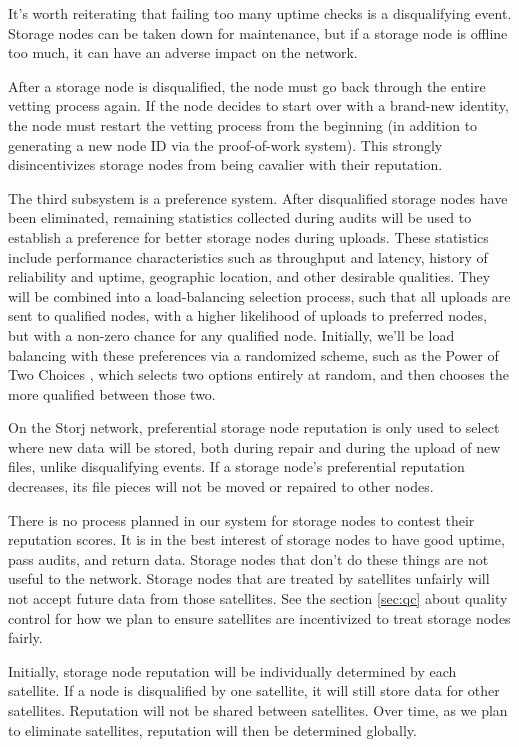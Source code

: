 \documentclass[11pt,fleqn,openany]{book}
\begin{document}
It's worth reiterating that failing too many uptime checks is a disqualifying
event. Storage nodes can be taken down for maintenance, but if a storage node
is offline too much, it can have an adverse impact on the network.

After a storage node is disqualified, the node must go back through the entire
vetting process again. If the node decides to start over with a brand-new
identity, the node must restart the vetting process from the beginning (in
addition to generating a new node ID via the proof-of-work system). This
strongly disincentivizes storage nodes from being cavalier with their
reputation.

The third subsystem is a preference system. After disqualified storage nodes
have been eliminated, remaining statistics collected during audits
will be used to establish a preference for better storage nodes during uploads.
These statistics include performance characteristics such as throughput and
latency, history of reliability and uptime, geographic location, and other
desirable qualities.
They will be combined into a load-balancing selection process, such
that all uploads are sent to qualified nodes, with a higher likelihood of
uploads to preferred nodes, but with a non-zero chance for any qualified node.
Initially, we'll be load balancing with these preferences via a randomized
scheme, such as the Power of Two Choices \cite{power-of-two-choices}, which
selects two options entirely at random, and then chooses the more qualified
between those two.

On the Storj network, preferential storage node reputation is only used to
select where new data will be stored, both during repair and during the
upload of new files, unlike disqualifying events.
If a storage node's preferential reputation decreases, its file pieces will not
be moved or repaired to other nodes.

There is no process planned in our system for storage nodes to contest their
reputation scores. It is in the best interest of storage nodes to have good
uptime, pass audits, and return data. Storage nodes that don't do these things
are not useful to the network. Storage nodes that are treated by satellites
unfairly will not accept future data from those satellites. See the section
\ref{sec:qc} about quality control for how we plan to ensure satellites are
incentivized to treat storage nodes fairly.

Initially, storage node reputation will be individually determined by each
satellite. If a node is disqualified by one satellite, it will still
store data for other satellites. Reputation will not be shared between
satellites. Over time, as we plan to eliminate satellites,
reputation will then be determined globally.
\end{document}
